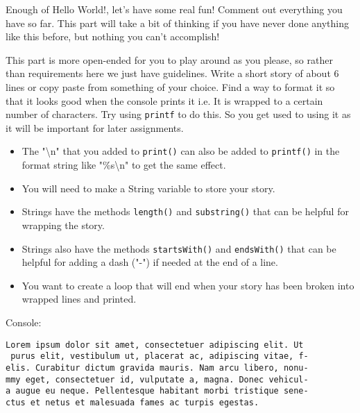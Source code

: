 \documentclass{report}
\begin{document}
Enough of Hello World!, let's have some real fun! Comment out everything you have so far. This part will take a bit of thinking if you have never done anything like this before, but nothing you can't accomplish!

This part is more open-ended for you to play around as you please, so rather than requirements here we just have guidelines. Write a short story of about 6 lines or copy paste from something of your choice. Find a way to format it so that it looks good when the console prints it i.e. It is wrapped to a certain number of characters. Try using \texttt{printf} to do this. So you get used to using it as it will be important for later assignments.

\begin{itemize}
\item The "\textbackslash n" that you added to \texttt{print()} can also be added to \texttt{printf()} in the format string like "\%s\textbackslash n" to get the same effect.
\item You will need to make a String variable to store your story.
\item Strings have the methods \texttt{length()} and \texttt{substring()} that can be helpful for wrapping the story.
\item Strings also have the methods \texttt{startsWith()} and \texttt{endsWith()} that can be helpful for adding a dash ("-") if needed at the end of a line.
\item You want to create a loop that will end when your story has been broken into wrapped lines and printed.
\end{itemize}

Console:
\begin{lstlisting}
Lorem ipsum dolor sit amet, consectetuer adipiscing elit. Ut
 purus elit, vestibulum ut, placerat ac, adipiscing vitae, f-
elis. Curabitur dictum gravida mauris. Nam arcu libero, nonu-
mmy eget, consectetuer id, vulputate a, magna. Donec vehicul-
a augue eu neque. Pellentesque habitant morbi tristique sene-
ctus et netus et malesuada fames ac turpis egestas.
\end{lstlisting}
\end{document}
